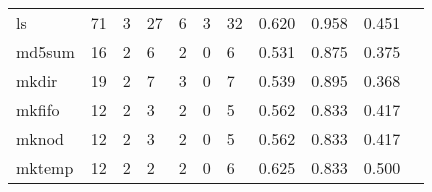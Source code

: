 \begin{longtable}{lp{1.2cm}p{1.2cm}p{1.2cm}p{1.2cm}p{1.2cm}p{1.2cm}p{1.2cm}p{1.2cm}p{1.2cm}p{1.2cm}}
ls        &                                    71 &                                                  3 &                                                 27 &                                                  6 &                                                  3 &                                                 32 &                                              0.620 &                                              0.958 &                                              0.451 \\
md5sum    &                                    16 &                                                  2 &                                                  6 &                                                  2 &                                                  0 &                                                  6 &                                              0.531 &                                              0.875 &                                              0.375 \\
mkdir     &                                    19 &                                                  2 &                                                  7 &                                                  3 &                                                  0 &                                                  7 &                                              0.539 &                                              0.895 &                                              0.368 \\
mkfifo    &                                    12 &                                                  2 &                                                  3 &                                                  2 &                                                  0 &                                                  5 &                                              0.562 &                                              0.833 &                                              0.417 \\
mknod     &                                    12 &                                                  2 &                                                  3 &                                                  2 &                                                  0 &                                                  5 &                                              0.562 &                                              0.833 &                                              0.417 \\
mktemp    &                                    12 &                                                  2 &                                                  2 &                                                  2 &                                                  0 &                                                  6 &                                              0.625 &                                              0.833 &                                              0.500 \\

\end{longtable}
